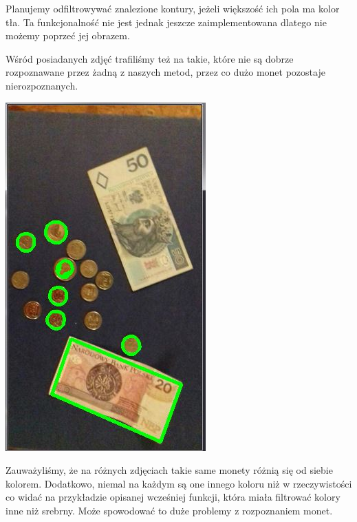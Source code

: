\documentclass[12pt]{article}
\begin{document}
Planujemy odfiltrowywać znalezione kontury, jeżeli większość ich pola ma kolor tła. Ta funkcjonalność nie jest jednak jeszcze zaimplementowana dlatego nie możemy poprzeć jej obrazem.

Wśród posiadanych zdjęć trafiliśmy też na takie, które nie są dobrze rozpoznawane przez żadną z naszych metod, przez co dużo monet pozostaje nierozpoznanych.

\includegraphics[scale=0.8]{slabe}

Zauważyliśmy, że na różnych zdjęciach takie same monety różnią się od siebie kolorem. Dodatkowo, niemal na każdym są one innego koloru niż w rzeczywistości co widać na przykładzie opisanej wcześniej funkcji, która miała filtrować kolory inne niż srebrny.
Może spowodować to duże problemy z rozpoznaniem monet.
\end{document}
